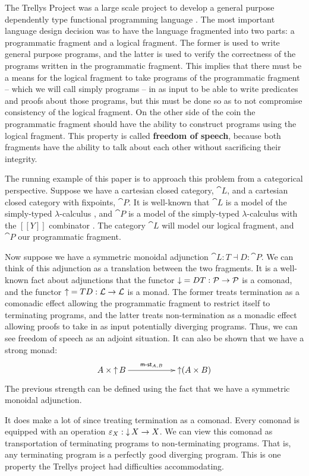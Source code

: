 The Trellys Project was a large scale project to develop a general
purpose dependently type functional programming language \cite{??}.
The most important language design decision was to have the language
fragmented into two parts: a programmatic fragment and a logical
fragment.  The former is used to write general purpose programs, and
the latter is used to verify the correctness of the programs written
in the programmatic fragment.  This implies that there must be a means
for the logical fragment to take programs of the programmatic fragment
-- which we will call simply programs -- in as input to be able to
write predicates and proofs about those programs, but this must be
done so as to not compromise consistency of the logical fragment.  On
the other side of the coin the programmatic fragment should have the
ability to construct programs using the logical fragment.  This
property is called \textbf{freedom of speech}, because both fragments
have the ability to talk about each other without sacrificing their
integrity.

The running example of this paper is to approach this problem from a
categorical perspective. Suppose we have a cartesian closed category,
$\cat{L}$, and a cartesian closed category with fixpoints, $\cat{P}$.
It is well-known that $\cat{L}$ is a model of the simply-typed
$\lambda$-calculus \cite{?}, and $\cat{P}$ is a model of the
simply-typed $\lambda$-calculus with the $[[Y]]$ combinator \cite{?}.
The category $\cat{L}$ will model our logical fragment, and $\cat{P}$
our programmatic fragment.

Now suppose we have a symmetric monoidal adjunction $\cat{L} : T
\dashv D : \cat{P}$. We can think of this adjunction as a translation
between the two fragments.  It is a well-known fact about adjunctions
that the functor $\mathop{\downarrow} = DT : \mathcal{P} \rightarrow \mathcal{P}$ is a comonad, and
the functor $\mathop{\uparrow} = TD : \mathcal{L} \rightarrow \mathcal{L}$ is a monad.  The former
treats termination as a comonadic effect allowing the programmatic
fragment to restrict itself to terminating programs, and the latter
treats non-termination as a monadic effect allowing proofs to take in
as input potentially diverging programs.  Thus, we can see freedom of
speech as an adjoint situation.  It can also be shown that we have a
strong monad:
\[
\bfig
\morphism<1000,0>[A \times \uar B`\uar(A \times B);\mst{A,B}]
\efig
\]
The previous strength can be defined using the fact that we have a
symmetric monoidal adjunction.

It does make a lot of since treating termination as a comonad.  Every
comonad is equipped with an operation $\varepsilon_X : \mathop{\downarrow} X \rightarrow X$.
We can view this comonad as transportation of terminating programs to
non-terminating programs.  That is, any terminating program is a
perfectly good diverging program.  This is one property the Trellys
project had difficulties accommodating.


